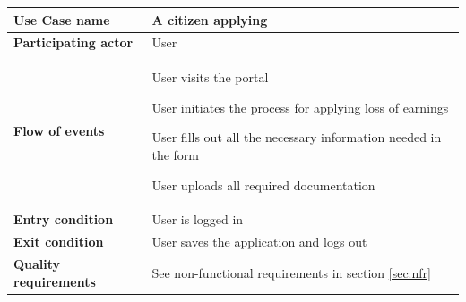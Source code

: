 \begin{table}[htb!]
\begin{tabularx}{\textwidth}{l|X}
	\textbf{Use Case name} & A citizen applying \\
	\hline
	\textbf{Participating actor} & User\\
	\hline
	\textbf{Flow of events} &
		\vspace{-2mm}
	    \begin{compactenum}
	        \item User visits the portal
	        \item User initiates the process for applying loss of earnings
	        \item User fills out all the necessary information needed in the form
	        \item User uploads all required documentation
	    \end{compactenum}\\
	\hline
	\textbf{Entry condition} & User is logged in\\
	\hline
	\textbf{Exit condition} & User saves the application and logs out\\
	\hline
	\textbf{Quality requirements} & See non-functional requirements in section \ref{sec:nfr}\\
\end{tabularx}
\end{table}
\newpage
